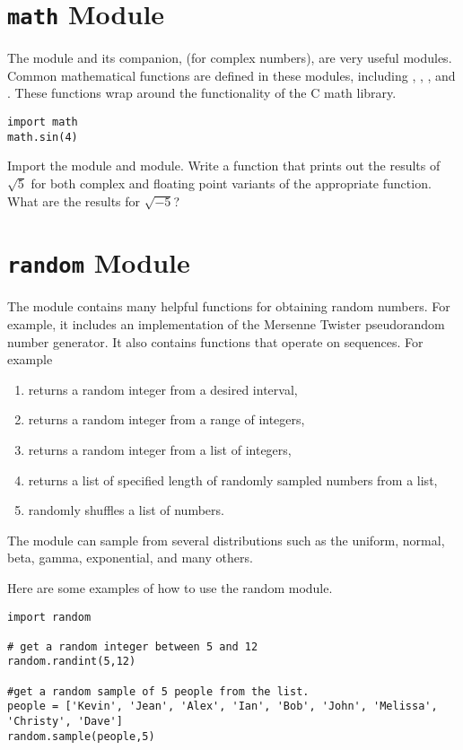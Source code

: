 \section*{\texttt{math} Module}
The  module and its companion,  (for complex numbers), are very useful modules.
Common mathematical functions are defined in these modules, including , , , and .
These functions wrap around the functionality of the C math library.
\begin{lstlisting}
import math
math.sin(4)
\end{lstlisting}

\begin{problem}
Import the  module and  module. Write a function that prints out the results of $\sqrt{5}$ for both complex and floating point variants of the appropriate function.  What are the results for $\sqrt{-5}$?
\end{problem}

\section*{\texttt{random} Module}
The  module contains many helpful functions for obtaining random numbers.
For example, it includes an implementation of the Mersenne Twister pseudorandom number generator.
It also contains functions that operate on sequences.  For example
\begin{enumerate}
\item {} returns a random integer from a desired interval,
\item {} returns a random integer from a range of integers,
\item {} returns a random integer from a list of integers,
\item {} returns a list of specified length of randomly sampled numbers from a list,
\item {} randomly shuffles a list of numbers.
\end{enumerate}
The  module can sample from several distributions such as the uniform, normal, beta, gamma, exponential, and many others.

Here are some examples of how to use the random module.
\begin{lstlisting}
import random

# get a random integer between 5 and 12
random.randint(5,12)

#get a random sample of 5 people from the list. 
people = ['Kevin', 'Jean', 'Alex', 'Ian', 'Bob', 'John', 'Melissa', 'Christy', 'Dave']
random.sample(people,5)
\end{lstlisting}

